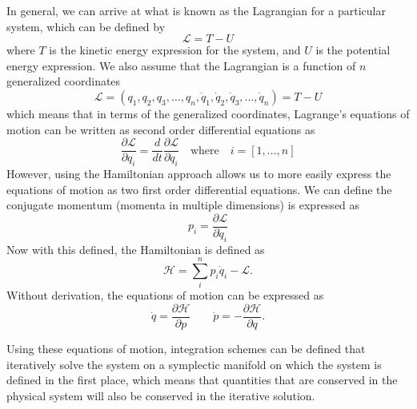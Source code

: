\documentclass[onecolumn,titlepage,letterpaper,10pt]{article}
\newcommand{\Lagr}{\mathcal{L}}
\newcommand{\ham}{\mathcal{H}}
\newcommand{\paren}[1]{\left(#1\right)}
\newcommand{\partialtop}[2]{\dfrac{\partial#1}{\partial #2}}
\newcommand{\derivative}[2]{\dfrac{d #1}{d #2}}
\begin{document}
In general, we can arrive at what is known as the Lagrangian for a particular
system, which can be defined by
\begin{equation}
    \Lagr = T - U
\end{equation}
where $T$ is the kinetic energy expression for the system, and $U$ is the
potential energy expression. We also assume that the Lagrangian is a function of
$n$ generalized coordinates
\begin{equation}
    \Lagr = \paren{q_1, q_2, q_3, \dots, q_n, \dot{q}_1, \dot{q}_2, \dot{q}_3,
    \dots, \dot{q}_n} = T - U
\end{equation}
which means that in terms of the generalized coordinates, Lagrange's equations
of motion can be written as second order differential equations as
\begin{equation}
    \partialtop{\Lagr}{q_i} = \derivative{}{t}\partialtop{\Lagr}{\dot{q}_i}
    \quad\text{where}\quad
    i = [1,\dots,n]
\end{equation}
However, using the Hamiltonian approach allows us to more easily express the
equations of motion as two first order differential equations. We can define the
conjugate momentum (momenta in multiple dimensions) is expressed as
\begin{equation}
    p_i = \partialtop{\Lagr}{\dot{q}_i}
\end{equation}
Now with this defined, the Hamiltonian is defined as
\begin{equation}
    \ham = \sum_{i}^{n} p_i \dot{q}_i - \Lagr.
\end{equation}
Without derivation, the equations of motion can be expressed as
\begin{equation}
    \dot{q} = \partialtop{\ham}{p}
    \quad\quad
    \dot{p} = -\partialtop{\ham}{q}.
\end{equation}

Using these equations of motion, integration schemes can be defined that
iteratively solve the system on a symplectic manifold on which the system
is defined in the first place, which means that quantities that are conserved in
the physical system will also be conserved in the iterative solution.

\end{document}
